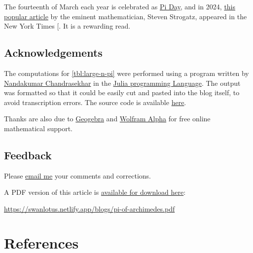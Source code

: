 \documentclass[
  a4paper,
]{article}
\begin{document}
The fourteenth of March each year is celebrated as
\href{https://en.wikipedia.org/wiki/Pi_Day}{Pi Day}, and in 2024,
\href{https://www.nytimes.com/article/pi-day-math-geometry-infinity.html}{this
popular article} by the eminent mathematician, Steven Strogatz, appeared
in the New York Times {[}\citeproc{ref-strogatz-pi-day-2024}{15}{]}. It
is a rewarding read.

\subsection{Acknowledgements}\label{acknowledgements}

The computations for \cref{tbl:large-n-pi} were performed using a
program written by
\href{https://www.linkedin.com/in/nandakumar-chandrasekhar-a400b45b/}{Nandakumar
Chandrasekhar} in the \href{https://julialang.org/}{Julia programming
Language}. The output was formatted so that it could be easily cut and
pasted into the blog itself, to avoid transcription errors. The source
code is available \href{auxiliary/pi_approximations.jl}{here}.

Thanks are also due to \href{https://www.geogebra.org/}{Geogebra} and
\href{https://www.wolframalpha.com/}{Wolfram Alpha} for free online
mathematical support.

\subsection{Feedback}\label{feedback}

Please \href{mailto:feedback.swanlotus@gmail.com}{email me} your
comments and corrections.

\noindent A PDF version of this article is
\href{./pi-of-archimedes.pdf}{available for download here}:

\url{https://swanlotus.netlify.app/blogs/pi-of-archimedes.pdf}

\section*{References}\label{bibliography}
\end{document}
